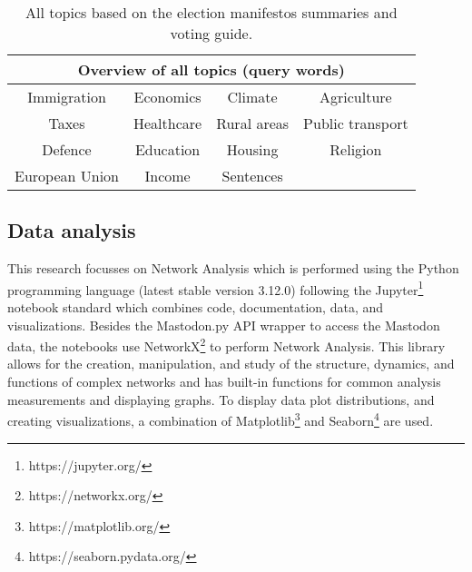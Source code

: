 \begin{table}
\centering
\begin{tabular}{||c c c c||} 
 \hline
 \multicolumn{4}{|c|}{\textbf{Overview of all topics (query words)}} \\
 \hline
 Immigration & Economics & Climate & Agriculture \\
 \hline
 Taxes & Healthcare & Rural areas & Public transport \\
 \hline
 Defence & Education & Housing & Religion \\
 \hline
 European Union & Income & Sentences &  \\
 \hline
\end{tabular}
\caption{All topics based on the election manifestos summaries and voting guide.}
\label{topic-table}
\end{table}

\subsection{Data analysis}

This research focusses on Network Analysis which is performed using the Python programming language (latest stable version 3.12.0) following the Jupyter\footnote{https://jupyter.org/} notebook standard which combines code, documentation, data, and visualizations. Besides the Mastodon.py API wrapper to access the Mastodon data, the notebooks use NetworkX\footnote{https://networkx.org/} to perform Network Analysis.
This library allows for the creation, manipulation, and study of the structure, dynamics, and functions of complex networks and has built-in functions for common analysis measurements and displaying graphs. To display data  plot distributions, and creating visualizations, a combination of Matplotlib\footnote{https://matplotlib.org/} and Seaborn\footnote{https://seaborn.pydata.org/} are used.